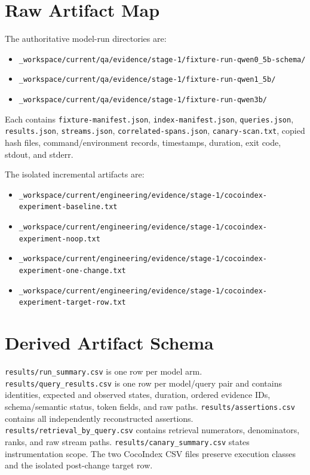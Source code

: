 \documentclass[10pt,twocolumn]{article}
\newcommand{\code}[1]{\texttt{#1}}
\DeclareRobustCommand{\rawpath}[1]{\nolinkurl{#1}}
\begin{document}
\section{Raw Artifact Map}
The authoritative model-run directories are:
\begin{itemize}
  \item \rawpath{_workspace/current/qa/evidence/stage-1/fixture-run-qwen0_5b-schema/}
  \item \rawpath{_workspace/current/qa/evidence/stage-1/fixture-run-qwen1_5b/}
  \item \rawpath{_workspace/current/qa/evidence/stage-1/fixture-run-qwen3b/}
\end{itemize}
Each contains \code{fixture-manifest.json}, \code{index-manifest.json}, \code{queries.json}, \code{results.json}, \code{streams.json}, \code{correlated-spans.json}, \code{canary-scan.txt}, copied hash files, command/environment records, timestamps, duration, exit code, stdout, and stderr.

The isolated incremental artifacts are:
\begin{itemize}
  \item \rawpath{_workspace/current/engineering/evidence/stage-1/cocoindex-experiment-baseline.txt}
  \item \rawpath{_workspace/current/engineering/evidence/stage-1/cocoindex-experiment-noop.txt}
  \item \rawpath{_workspace/current/engineering/evidence/stage-1/cocoindex-experiment-one-change.txt}
  \item \rawpath{_workspace/current/engineering/evidence/stage-1/cocoindex-experiment-target-row.txt}
\end{itemize}

\section{Derived Artifact Schema}
\rawpath{results/run_summary.csv} is one row per model arm.  \rawpath{results/query_results.csv} is one row per model/query pair and contains identities, expected and observed states, duration, ordered evidence IDs, schema/semantic status, token fields, and raw paths.  \rawpath{results/assertions.csv} contains all independently reconstructed assertions.  \rawpath{results/retrieval_by_query.csv} contains retrieval numerators, denominators, ranks, and raw stream paths.  \rawpath{results/canary_summary.csv} states instrumentation scope.  The two CocoIndex CSV files preserve execution classes and the isolated post-change target row.
\end{document}
